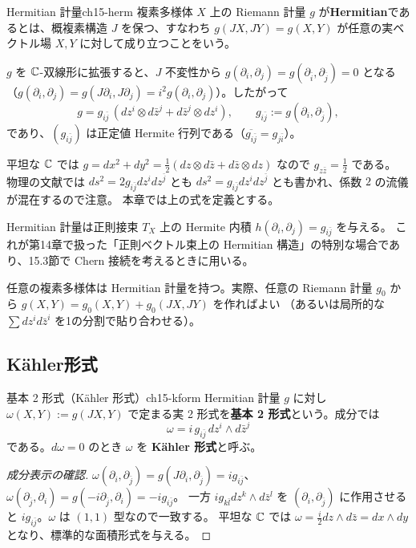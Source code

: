 \begin{mydef}{Hermitian 計量}{ch15-herm}
複素多様体 $X$ 上の Riemann 計量 $g$ が\textbf{Hermitian}であるとは、概複素構造 $J$ を保つ、すなわち
$g(JX,JY) = g(X,Y)$ が任意の実ベクトル場 $X,Y$ に対して成り立つことをいう。
\end{mydef}

$g$ を $\mathbb{C}$-双線形に拡張すると、$J$ 不変性から $g(\partial_i,\partial_j) = g(\partial_{\bar i},\partial_{\bar j}) = 0$ となる
（$g(\partial_i,\partial_j) = g(J\partial_i,J\partial_j) = i^2 g(\partial_i,\partial_j)$）。したがって
\[
g = g_{i\bar j}\,(dz^i\otimes d\bar z^{j} + d\bar z^{j}\otimes dz^i),\qquad g_{i\bar j} := g(\partial_i,\partial_{\bar j}),
\]
であり、$(g_{i\bar j})$ は正定値 Hermite 行列である（$\overline{g_{i\bar j}} = g_{j\bar i}$）。
\begin{note}
平坦な $\mathbb{C}$ では $g = dx^2 + dy^2 = \frac12(dz\otimes d\bar z + d\bar z\otimes dz)$ なので $g_{z\bar z} = \frac12$ である。
物理の文献では $ds^2 = 2g_{i\bar j}dz^idz^{\bar j}$ とも $ds^2 = g_{i\bar j}dz^idz^{\bar j}$ とも書かれ、係数 $2$ の流儀が混在するので注意。
本章では上の式を定義とする。
\end{note}
Hermitian 計量は正則接束 $T_X$ 上の Hermite 内積 $h(\partial_i,\partial_j) = g_{i\bar j}$ を与える。
これが第14章で扱った「正則ベクトル束上の Hermitian 構造」の特別な場合であり、15.3節で Chern 接続を考えるときに用いる。

任意の複素多様体は Hermitian 計量を持つ。実際、任意の Riemann 計量 $g_0$ から $g(X,Y) = g_0(X,Y)+g_0(JX,JY)$ を作ればよい
（あるいは局所的な $\sum dz^i d\bar z^i$ を1の分割で貼り合わせる）。

\subsection{K\"ahler形式}

\begin{mydef}{基本 2 形式（K\"ahler 形式）}{ch15-kform}
Hermitian 計量 $g$ に対し $\omega(X,Y) := g(JX,Y)$ で定まる実 2 形式を\textbf{基本 2 形式}という。成分では
\[
\omega = i\,g_{i\bar j}\,dz^i\wedge d\bar z^{j}
\]
である。$d\omega=0$ のとき $\omega$ を \textbf{K\"ahler 形式}と呼ぶ。
\end{mydef}

\begin{proof}[成分表示の確認]
$\omega(\partial_i,\partial_{\bar j}) = g(J\partial_i,\partial_{\bar j}) = i g_{i\bar j}$、$\omega(\partial_{\bar j},\partial_i) = g(-i\partial_{\bar j},\partial_i) = -ig_{i\bar j}$。
一方 $i g_{k\bar l}dz^k\wedge d\bar z^l$ を $(\partial_i,\partial_{\bar j})$ に作用させると $i g_{i\bar j}$。$\omega$ は $(1,1)$ 型なので一致する。
平坦な $\mathbb{C}$ では $\omega = \frac{i}{2}dz\wedge d\bar z = dx\wedge dy$ となり、標準的な面積形式を与える。
\end{proof}

